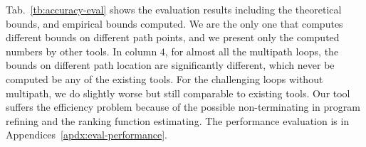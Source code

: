 Tab.~\ref{tb:accuracy-eval} shows the evaluation results including the theoretical bounds, and empirical bounds computed.
We are the only one that computes different bounds on different path points,
and we present only the computed numbers by other tools. In column $4$, for almost all the multipath loops, the bounds on different path location are significantly different, which never be computed be any of the existing tools.
For the challenging loops without multipath, we do slightly worse but still comparable to existing tools.
Our tool suffers the efficiency problem because of the possible non-terminating in program refining and the ranking function estimating.
The performance evaluation is in Appendices~\ref{apdx:eval-performance}.
